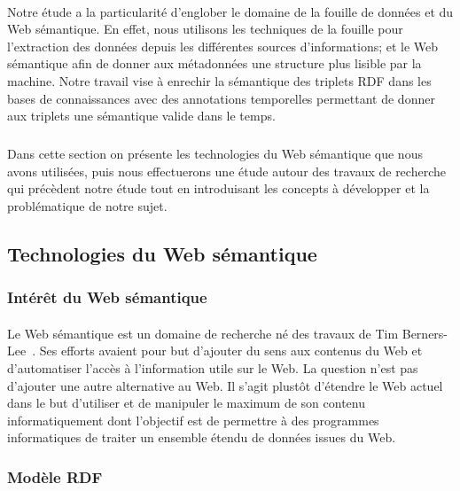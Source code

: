 \documentclass[12pt,a4]{report}
\begin{document}
\paragraph{}
Notre étude a la particularité d’englober le domaine de la fouille de données et du Web sémantique. 
En effet, nous utilisons les techniques de la fouille pour l'extraction des données depuis les différentes sources d'informations; et le Web sémantique afin de donner aux métadonnées une structure plus lisible par la machine. Notre travail vise à enrechir la sémantique des triplets RDF dans les bases de connaissances avec des annotations temporelles permettant de donner aux triplets une sémantique valide dans le temps.
\subparagraph{}
Dans cette section on présente les technologies du Web sémantique que nous avons utilisées, puis nous effectuerons une étude autour des travaux de recherche qui précèdent notre étude tout en introduisant les concepts à développer et la problématique de notre sujet.
\subsection{Technologies du Web sémantique}
\subsubsection{Intérêt du Web sémantique}
\paragraph{}
Le Web sémantique est un domaine de recherche né des travaux de Tim Berners-Lee~\cite{Berners-lee2001}. Ses efforts avaient pour but d'ajouter du sens aux contenus du Web et d'automatiser l'accès à l'information utile sur le Web. La question n’est pas d'ajouter une autre alternative au Web. Il s’agit plustôt d'étendre le Web actuel dans le but d'utiliser et de manipuler le maximum de son contenu informatiquement dont l’objectif est de permettre à des programmes informatiques de traiter un ensemble étendu de données issues du Web.
\subsubsection{Modèle RDF}
\end{document}
